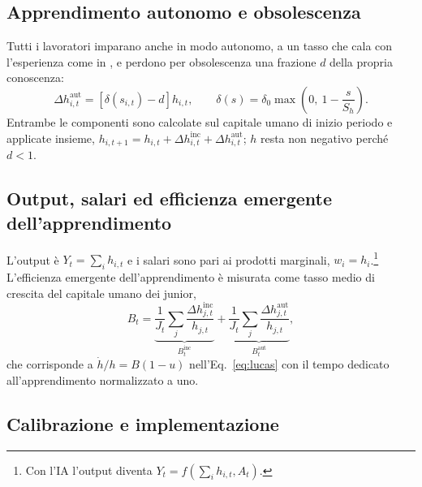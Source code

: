 \documentclass[preprint,12pt,authoryear]{elsarticle}
\begin{document}
\subsection{Apprendimento autonomo e obsolescenza}

Tutti i lavoratori imparano anche in modo autonomo, a un tasso che cala con l'esperienza come in \citet{BenPorath1967}, e perdono per obsolescenza una frazione $d$ della propria conoscenza:
\begin{equation}\label{eq:aut}
\Delta h^{\mathrm{aut}}_{i,t} = \left[\delta(s_{i,t})-d\right] h_{i,t}, \qquad \delta(s) = \delta_0 \max\!\left(0,\ 1-\frac{s}{S_h}\right).
\end{equation}
Entrambe le componenti sono calcolate sul capitale umano di inizio periodo e applicate insieme, $h_{i,t+1}=h_{i,t}+\Delta h^{\mathrm{inc}}_{i,t}+\Delta h^{\mathrm{aut}}_{i,t}$; $h$ resta non negativo perché $d<1$.

\subsection{Output, salari ed efficienza emergente dell'apprendimento}

L'output è $Y_t=\sum_i h_{i,t}$ e i salari sono pari ai prodotti marginali, $w_i = h_i$.\footnote{Con l'IA l'output diventa $Y_t = f(\sum_i h_{i,t}, A_t)$.} L'efficienza emergente dell'apprendimento è misurata come tasso medio di crescita del capitale umano dei junior,
\begin{equation}\label{eq:B}
B_t = \underbrace{\frac{1}{J_t}\sum_{j}\frac{\Delta h^{\mathrm{inc}}_{j,t}}{h_{j,t}}}_{B^{\mathrm{inc}}_t} + \underbrace{\frac{1}{J_t}\sum_{j}\frac{\Delta h^{\mathrm{aut}}_{j,t}}{h_{j,t}}}_{B^{\mathrm{aut}}_t},
\end{equation}
che corrisponde a $\dot h/h = B(1-u)$ nell'Eq.~\eqref{eq:lucas} con il tempo dedicato all'apprendimento normalizzato a uno.

\subsection{Calibrazione e implementazione}
\end{document}
